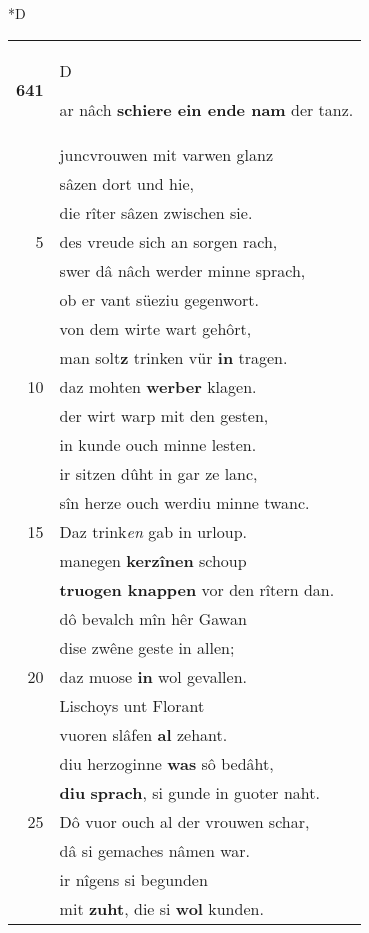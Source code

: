 \documentclass[8pt,a4paper,notitlepage]{article}
\begin{document}
\begin{table}[ht]
\begin{minipage}[t]{0.5\linewidth}
\small
\begin{center}*D
\end{center}
\begin{tabular}{rl}
\textbf{641} & \begin{large}D\end{large}ar nâch \textbf{schiere ein ende nam} der tanz.\\ 
 & juncvrouwen mit varwen glanz\\ 
 & sâzen dort und hie,\\ 
 & die rîter sâzen zwischen sie.\\ 
5 & des vreude sich an sorgen rach,\\ 
 & swer dâ nâch werder minne sprach,\\ 
 & ob er vant süeziu gegenwort.\\ 
 & von dem wirte wart gehôrt,\\ 
 & man solt\textbf{z} trinken vür \textbf{in} tragen.\\ 
10 & daz mohten \textbf{werber} klagen.\\ 
 & der wirt warp mit den gesten,\\ 
 & in kunde ouch minne lesten.\\ 
 & ir sitzen dûht in gar ze lanc,\\ 
 & sîn herze ouch werdiu minne twanc.\\ 
15 & Daz trink\textit{en} gab in urloup.\\ 
 & manegen \textbf{kerzînen} schoup\\ 
 & \textbf{truogen knappen} vor den rîtern dan.\\ 
 & dô bevalch mîn hêr Gawan\\ 
 & dise zwêne geste in allen;\\ 
20 & daz muose \textbf{in} wol gevallen.\\ 
 & Lischoys unt Florant\\ 
 & vuoren slâfen \textbf{al} zehant.\\ 
 & diu herzoginne \textbf{was} sô bedâht,\\ 
 & \textbf{diu} \textbf{sprach}, si gunde in guoter naht.\\ 
25 & Dô vuor ouch al der vrouwen schar,\\ 
 & dâ si gemaches nâmen war.\\ 
 & ir nîgens si begunden\\ 
 & mit \textbf{zuht}, die si \textbf{wol} kunden.\\ 

\end{tabular}
\end{minipage}
\end{table}
\end{document}
